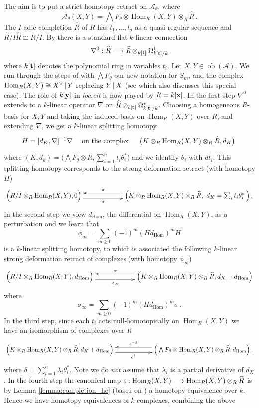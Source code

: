 \documentclass[english,letter paper,12pt,leqno]{article}
\theoremstyle{example}
\numberwithin{equation}{section}
\def\AA{\mathcal{A}}
\def\ob{\operatorname{ob}}
\def\Hom{\operatorname{Hom}}
\def\be{\begin{equation}}
\def\ee{\end{equation}}
\begin{document}
The aim is to put a strict homotopy retract \cite[\S 3.3]{lazaroiu} on $\AA_\theta$, where
\[
\AA_\theta(X,Y) = \bigwedge F_\theta \otimes \Hom_R(X,Y) \otimes_R \widehat{R}\,.
\]
The $I$-adic completion $\widehat{R}$ of $R$ has $t_1,\ldots,t_n$ as a quasi-regular sequence and $\widehat{R}/I \widehat{R} \cong R/I$. By \cite[Appendix B]{pushforward} there is a standard flat $k$-linear connection
\[
\nabla^0: \widehat{R} \longrightarrow \widehat{R} \otimes_{k[\bold{t}]} \Omega^1_{k[\bold{t}]/k}
\]
where $k[\bold{t}]$ denotes the polynomial ring in variables $t_i$. Let $X,Y \in \ob(\AA)$. We run through the steps of \cite[\S 4.3]{cut} with $\bigwedge F_\theta$ our new notation for $S_m$, and the complex $\Hom_R(X,Y) \cong X^{\vee} \l Y$ replacing $Y \,|\, X$ (see \cite[\S 4.5]{cut} which also discusses this special case). The role of $k[\bold{y}]$ in \emph{loc.cit} is now played by $R = k[\bold{x}]$. In the first step $\nabla^0$ extends to a $k$-linear operator $\nabla$ on $\widehat{R} \otimes_{k[\bold{t}]} \Omega^*_{k[\bold{t}]/k}$. Choosing a homogeneous $R$-basis for $X,Y$ and taking the induced basis on $\Hom_R(X,Y)$ over $R$, and extending $\nabla$, we get a $k$-linear splitting homotopy
\[
H = [d_K, \nabla]^{-1} \nabla \quad \text{ on the complex } \quad \xymatrix{ \big( K \otimes_R \Hom_R(X,Y) \otimes_R \widehat{R}, d_K \big) }
\]
where $(K,d_k) = \big( \bigwedge F_\theta \otimes R, \sum_{i=1}^n t_i \theta_i^* \big)$ and we identify $\theta_i$ with $dt_i$. This splitting homotopy corresponds to the strong deformation retract (with homotopy $H$)
\[
\xymatrix@C+3pc{
\Big(R/I \otimes_R \Hom_R(X,Y),0\Big) \ar@<-1ex>[r]_-\sigma & \Big( K \otimes_R \Hom_R(X,Y) \otimes_R \widehat{R}, \,\,d_K = \sum_i t_i \theta_i^*\, \Big)\,, \ar@<-1ex>[l]_-\pi
}
\]
In the second step we view $d_{\Hom}$, the differential on $\Hom_R(X,Y)$, as a perturbation and we learn that
\be\label{eq:phi_infty_appendix}
\phi_\infty = \sum_{m \ge 0} (-1)^m (H d_{\Hom})^m H
\ee
is a $k$-linear splitting homotopy, to which is associated the following $k$-linear strong deformation retract of complexes (with homotopy $\phi_{\infty}$)
\[
\xymatrix@C+3pc@R+3pc{
\Big( R/I \otimes_R \Hom_R(X,Y), d_{\Hom} \Big) \ar@<-1ex>[r]_-{\sigma_\infty} &
\Big( K \otimes_R \Hom_R(X,Y) \otimes_R \widehat{R}, d_K + d_{\Hom} \Big) \ar@<-1ex>[l]_-{\pi}
}
\]
where
\be\label{eq:sigma_infty_appendix}
\sigma_\infty = \sum_{m \ge 0} (-1)^m (H d_{\Hom})^m \sigma\,.
\ee
In the third step, since each $t_i$ acts null-homotopically on $\Hom_R(X,Y)$ we have an isomorphism of complexes over $R$
\[
\xymatrix@C+3pc{
\Big( K \otimes_R \Hom_R(X,Y) \otimes_R \widehat{R}, d_K + d_{\Hom} \Big) \ar@<-1ex>[r]_-{e^{\delta}} & \Big( \bigwedge F_\theta \otimes \Hom_R(X,Y) \otimes_R \widehat{R}, d_{\Hom} \Big)\,, \ar@<-1ex>[l]_-{e^{-\delta}}
}
\]
where $\delta = \sum_{i=1}^n \lambda_i \theta_i^*$. Note we do \emph{not} assume that $\lambda_i$ is a partial derivative of $d_X$. In the fourth step the canonical map $\varepsilon: \Hom_R(X,Y) \lto \Hom_R(X,Y) \otimes_R \widehat{R}$ is by Lemma \ref{lemma:completion_he} (based on \cite[Remark 7.7]{pushforward}) a homotopy equivalence over $k$. Hence we have homotopy equivalences of $k$-complexes, combining the above
\end{document}
